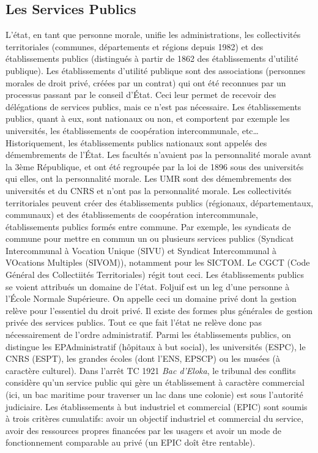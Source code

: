 \documentclass[math]{cours}
\begin{document}
\subsection{Les Services Publics}
L'état, en tant que personne morale, unifie les administrations, les collectivités territoriales (communes, départements et régions depuis 1982) et des établissements publics (distingués à partir de 1862 des établissements d'utilité publique).
Les établissements d'utilité publique sont des associations (personnes morales de droit privé, créées par un contrat) qui ont été reconnues par un processus passant par le conseil d'État.
Ceci leur permet de recevoir des délégations de services publics, mais ce n'est pas nécessaire.
Les établissements publics, quant à eux, sont nationaux ou non, et comportent par exemple les universités, les établissements de coopération intercommunale, etc\ldots
Historiquement, les établissements publics nationaux sont appelés des démembrements de l'État. Les facultés n'avaient pas la personnalité morale avant la 3ème République, et ont été regroupée par la loi de 1896 sous des universités qui elles, ont la personnalité morale.
Les UMR sont des démembrements des universités et du CNRS et n'ont pas la personnalité morale.
Les collectivités territoriales peuvent créer des établissements publics (régionaux, départementaux, communaux) et des établissements de coopération intercommunale, établissements publics formés entre commune.
Par exemple, les syndicats de commune pour mettre en commun un ou plusieurs services publics (Syndicat Intercommunal à Vocation Unique (SIVU) et Syndicat Intercommunal à VOcations Multiples (SIVOM)), notamment pour les SICTOM.
Le CGCT (Code Général des Collectiités Territoriales) régit tout ceci.
Les établissements publics se voient attribués un domaine de l'état.
Foljuif est un leg d'une personne à l'École Normale Supérieure. On appelle ceci un domaine privé dont la gestion relève pour l'essentiel du droit privé.
Il existe des formes plus générales de gestion privée des services publics.
Tout ce que fait l'état ne relève donc pas nécessairement de l'ordre administratif.
Parmi les établissements publics, on distingue les EPAdministratif (hôpitaux à but social), les universités (ESPC), le CNRS (ESPT), les grandes écoles (dont l'ENS, EPSCP) ou les musées (à caractère culturel).
Dans l'arrêt TC 1921 \emph{Bac d'Eloka}, le tribunal des conflits considère qu'un service public qui gère un établissement à caractère commercial (ici, un bac maritime pour traverser un lac dans une colonie) est sous l'autorité judiciaire.
Les établissements à but industriel et commercial (EPIC) sont soumis à trois critères cumulatifs: avoir un objectif industriel et commercial du service, avoir des ressources propres financées par les usagers et avoir un mode de fonctionnement comparable au privé (un EPIC doît être rentable).
\end{document}
